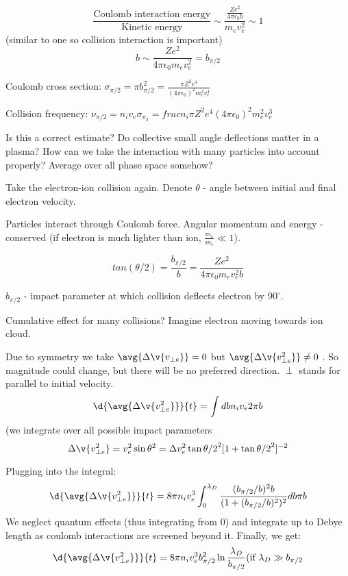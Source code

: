 \documentclass[PlasmaNotes.tex]{subfiles}
\begin{document}
\[\frac{\text{Coulomb interaction energy}}{\text{Kinetic energy}} \sim \frac{\frac{Ze^2}{4 \pi \epsilon_0 b}}{m_e v_e^2} \sim 1 \]
(similar to one so collision interaction is important)
\[b \sim \frac{Ze^2}{4 \pi \epsilon_0 m_e v_e^2} = b_{\pi/2} \]

Coulomb cross section: $\sigma_{\pi/2} = \pi b_{\pi/2}^2 = \frac{\pi Z^2 e^4}{(4 \pi \epsilon_0)^2 m_e^2 v_e^4}$

Collision frequency: $\nu_{\pi/2} = n_i v_e \sigma_{\pi_2} = frac{n_i \pi Z^2 e^4}{(4 \pi \epsilon_0)^2 m_e^2 v_e^3}$

Is this a correct estimate? Do collective small angle deflections matter in a plasma? How can we take the interaction with many particles into account properly? Average over all phase space somehow?

Take the electron-ion collision again.
Denote $\theta$ - angle between initial and final electron velocity.

Particles interact through Coulomb force. Angular momentum and energy - conserved (if electron is much lighter than ion, $\frac{m_e}{m_i} \ll 1$).

\[ tan(\theta/2) = \frac{b_{\pi/2}}{b} = \frac{Ze^2}{4 \pi \epsilon_0 m_e v_e^2 b} \]

$b_{\pi/2}$ - impact parameter at which collision deflects electron by $90^\circ$.

Cumulative effect for many collisions? Imagine electron moving towards ion cloud.

Due to symmetry we take $\avg{\Delta \v{v_{\perp e}}} =0$ but $\avg{\Delta \v{v_{\perp e}^2}} \neq 0$ . So magnitude could change, but there will be no preferred direction. $\perp$ stands for parallel to initial velocity.
\[\d{\avg{\Delta \v{v_{\perp e}^2}}}{t} =\int db n_i v_e 2 \pi b \]
(we integrate over all possible impact parameters
\[ \Delta \v{v_{\perp e}^2} = v_e^2 \sin{\theta}^2 = \Delta v_e^2 \tan{\theta/2}^2 [1+\tan{\theta/2}^2]^{-2} \]

Plugging into the integral:
\[\d{\avg{\Delta \v{v_{\perp e}^2}}}{t} =8 \pi n_i v_e^3 \int_0^{\lambda_D} \frac{(b_{\pi/2} / b)^2 b}{(1+(b_{\pi/2} / b)^2)^2} db \pi b \]
We neglect quantum effects (thus integrating from 0) and integrate up to Debye length as coulomb interactions are screened beyond it. Finally, we get:
\[\d{\avg{\Delta \v{v_{\perp e}^2}}}{t} = 8 \pi n_i v_e^3 b_{\pi/2}^2 \ln{\frac{\lambda_D}{b_{\pi/2}}} \text{(if $\lambda_D \gg b_{\pi/2}$} \]
\end{document}

